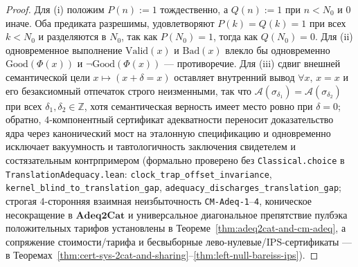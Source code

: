 \documentclass[11pt]{article}
\theoremstyle{plain}
\theoremstyle{definition}
\begin{document}
\begin{proof}
Для (i) положим $P(n) := 1$ тождественно, а $Q(n) := 1$ при $n < N_0$ и $0$ иначе. Оба предиката разрешимы, удовлетворяют $P(k) = Q(k) = 1$ при всех $k < N_0$ и разделяются в $N_0$, так как $P(N_0) = 1$, тогда как $Q(N_0) = 0$. Для (ii) одновременное выполнение $\mathrm{Valid}(x)$ и $\mathrm{Bad}(x)$ влекло бы одновременно $\mathrm{Good}(\Phi(x))$ и $\neg\mathrm{Good}(\Phi(x))$ --- противоречие. Для (iii) сдвиг внешней семантической цели $x \mapsto (x + \delta = x)$ оставляет внутренний вывод $\forall x,\, x = x$ и его безаксиомный отпечаток строго неизменными, так что $\mathcal{A}(\sigma_{\delta_1}) = \mathcal{A}(\sigma_{\delta_2})$ при всех $\delta_1, \delta_2 \in \mathbb{Z}$, хотя семантическая верность имеет место ровно при $\delta = 0$; обратно, $4$-компонентный сертификат адекватности переносит доказательство ядра через канонический мост на эталонную спецификацию и одновременно исключает вакуумность и тавтологичность заключения свидетелем и состязательным контрпримером (формально проверено без \texttt{Classical.choice} в \texttt{TranslationAdequacy.lean}: \texttt{clock\_\allowbreak trap\_\allowbreak offset\_\allowbreak invariance}, \texttt{kernel\_\allowbreak blind\_\allowbreak to\_\allowbreak translation\_\allowbreak gap}, \texttt{adequacy\_\allowbreak discharges\_\allowbreak translation\_\allowbreak gap}; строгая $4$-сторонняя взаимная неизбыточность \texttt{CM-Adeq-1}--\texttt{4}, коническое несокращение в $\mathbf{Adeq2Cat}$ и универсальное диагональное препятствие пулбэка положительных тарифов установлены в Теореме~\ref{thm:adeq2cat-and-cm-adeq}, а сопряжение стоимости/тарифа и бесвыборные лево-нулевые/$\mathrm{IPS}$-сертификаты --- в Теоремах~\ref{thm:cert-sys-2cat-and-sharing}--\ref{thm:left-null-bareiss-ips}).
\end{proof}
\end{document}

